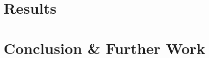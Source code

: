 \documentclass[11pt, oneside]{article}
\begin{document}
	\section{Results}
	
	\label{results}
		
	\section{Conclusion \& Further Work}
	
	\label{conclusion}
	\newpage
	
	
	
	
	\newpage
	
	
	\newpage
	

	
	
	\begin{comment}
		
	In this section, I consider alternative explanations for the price differences I found between minority and white hosts. In particular, I examine three relevant mechanisms that are not discrimination that could explain my results. I will then argue that these mechanisms would be insufficient in doing so. 
	
	\textbf{2. Price observed during the scrape is not the price normally set by hosts or observed by guests}
	
	The prices I used in my data analysis were prices from one particular day in 2015-2016. I ran my regressions on the assumption that this is the price that hosts set and that guests observe that drives guest booking decisions and host revenue outcomes. However, imagine that for one day, all of the white people on Airbnb raise their prices. That day, the scrape happens to take place, and the next day, the prices of White hosts all go back down. Then, the price that I observed in my data for White hosts would be high even though it doesn't incorporate real demand differences between races nor is tied to listing characteristics or host quality. While this may seem like an unlikely scenario, price hikes for the weekend or for holidays like July 4th or New Year's may give rise to a similar situation if black hosts change their prices differently than White hosts. 
	

	\textbf{3. Data clean-up disproportionately dropped lower-priced listings of White hosts or higher-priced listings of minority hosts}
	
	During my analysis, I left out hosts that had no profile picture. If hosts are aware of the potential effects of discrimination, minority hosts might be less likely to include a profile picture. If minority hosts who own higher-priced listings dropped out of the data set in this way, my coefficients might be biased downward because the sample doesn't include the higher-priced listings owned by minority hosts. A similar thing could have happened when I restricted my data set to listings with a price per night of less than \$800, and to listings owned by hosts who owned fewer than 20 listings total. If those hosts who owned a lot of listings or charged wildly high prices per night were disproportionately black, Hispanic, or Asian, I'd see a similar downward bias on my coefficients.
	

\end{comment}
\end{document}
